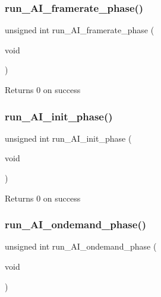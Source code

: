 \subsubsection{\texorpdfstring{run\+\_\+\+A\+I\+\_\+framerate\+\_\+phase()}{run\_AI\_framerate\_phase()}}
{\footnotesize\ttfamily unsigned int run\+\_\+\+A\+I\+\_\+framerate\+\_\+phase (\begin{DoxyParamCaption}\item[{void}]{ }\end{DoxyParamCaption})}

\begin{DoxyReturn}{Returns}
0 on success 
\end{DoxyReturn}
\mbox{\label{group__phase__functions_ga6bb4b660e654f63d0ac7516e14552c47}} 
\subsubsection{\texorpdfstring{run\+\_\+\+A\+I\+\_\+init\+\_\+phase()}{run\_AI\_init\_phase()}}
{\footnotesize\ttfamily unsigned int run\+\_\+\+A\+I\+\_\+init\+\_\+phase (\begin{DoxyParamCaption}\item[{void}]{ }\end{DoxyParamCaption})}

\begin{DoxyReturn}{Returns}
0 on success 
\end{DoxyReturn}
\mbox{\label{group__phase__functions_gab7ce668503b6b6b8b508a764d2a0e7d8}} 
\subsubsection{\texorpdfstring{run\+\_\+\+A\+I\+\_\+ondemand\+\_\+phase()}{run\_AI\_ondemand\_phase()}}
{\footnotesize\ttfamily unsigned int run\+\_\+\+A\+I\+\_\+ondemand\+\_\+phase (\begin{DoxyParamCaption}\item[{void}]{ }\end{DoxyParamCaption})}

